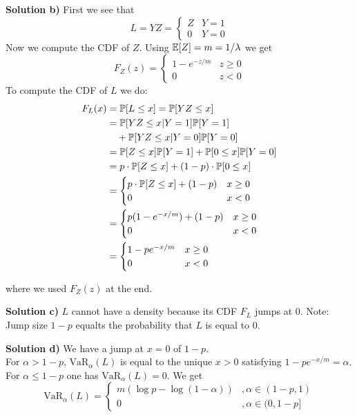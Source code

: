 \textbf{Solution b)}
First we see that
\[
    L = YZ =
    \begin{cases}
        Z & Y = 1 \\
        0 & Y = 0
    \end{cases}
\]
Now we compute the CDF of $Z$. Using $\mathbb{E}[Z] = m = 1/\lambda$ we get
\[
    F_Z(z) =
    \begin{cases}
        1 - e^{-z/m} & z\geq 0 \\
        0 & z < 0
    \end{cases}
\]
To compute the CDF of $L$ we do:
\begin{align*}
    F_L(x) &= \mathbb{P}[L \leq x] = \mathbb{P}[YZ \leq x] \\
          &= \mathbb{P}[YZ \leq x | Y = 1]\mathbb{P}[Y = 1] \\
          & \quad+ \mathbb{P}[YZ \leq x | Y = 0]\mathbb{P}[Y = 0] \\
          &= \mathbb{P}[Z\leq x]\mathbb{P}[Y=1] + \mathbb{P}[0 \leq x]\mathbb{P}[Y=0] \\
          &= p\cdot\mathbb{P}[Z\leq x] + (1-p)\cdot\mathbb{P}[0\leq x] \\
          &= \begin{cases}
              p\cdot\mathbb{P}[Z \leq x] + (1-p) & x\geq 0 \\
              0 & x < 0
             \end{cases} \\
          &= \begin{cases}
              p(1-e^{-x/m}) + ( 1 - p ) & x \geq 0 \\
              0 & x < 0
             \end{cases} \\
          &= \begin{cases}
              1 - p e^{-x/m} & x \geq 0 \\
              0 & x < 0
             \end{cases}
\end{align*}

where we used $F_Z(z)$ at the end.

\textbf{Solution c)}
$L$ cannot have a density because its CDF $F_L$ jumps at 0.
Note: Jump size $1-p$ equalts the probability that $L$ is equal to $0$.

\textbf{Solution d)}
We have a jump at $x=0$ of $1-p$.\\
For $\alpha > 1 - p$, $\text{VaR}_\alpha(L)$ is equal to the unique $x>0$ satisfying $1-pe^{-x/m} = \alpha$. \\
For $\alpha \leq 1-p$ one has $\text{VaR}_\alpha(L) = 0$.
We get 
\[
    \text{VaR}_\alpha(L) =
    \begin{cases}
        m(\log p - \log(1-\alpha)) &, \alpha \in (1-p, 1) \\
        0 &, \alpha \in (0, 1-p]
    \end{cases}
\]

